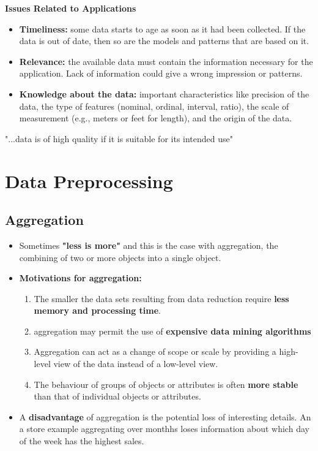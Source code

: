 	{\bf Issues Related to Applications}
		\begin{itemize}
			\item {\bf Timeliness:} some data starts to age as soon as it had been 
			collected. If the data is out of date, then so are the models and patterns
			that are based on it. 
			\item {\bf Relevance:} the available data must contain the information necessary
			for the application. Lack of information could give a wrong impression or patterns.
			\item {\bf Knowledge about the data:} important characteristics like precision of the
			data, the type of features (nominal, ordinal, interval, ratio), the scale of 
			measurement (e.g., meters or feet for length), and the origin of the data.
		\end{itemize}

		\vspace{1cm}

		{\LARGE "...data is of high quality if it is suitable for its intended use"}



\section{Data Preprocessing}
	
	\subsection*{Aggregation}
		\begin{itemize}
			\item Sometimes {\bf "less is more"} and this is the case with aggregation, 
			the combining of two or more objects into a single object. 
			\item {\bf Motivations for aggregation:}
				\begin{enumerate}
					\item The smaller the data sets resulting from data reduction
					require {\bf less memory and processing time}.
					\item aggregation may permit the use of {\bf expensive data mining 
					algorithms}
					\item Aggregation can act as a change of scope or scale by providing a
					high-level view of the data instead of a low-level view. 
					\item The behaviour of groups of objects or attributes is often {\bf more
					stable} than that of individual objects or attributes. 
				\end{enumerate}
			\item A {\bf disadvantage} of aggregation is the potential loss of interesting details. 
			An a store example aggregating over monthhs loses information about which day of the
			week has the highest sales. 
		\end{itemize}

